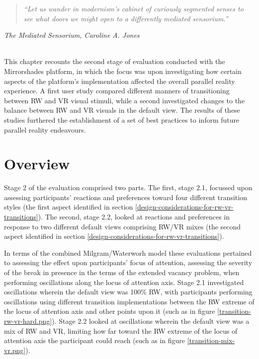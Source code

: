 \begin{quote}
	\textit{``Let us wander in modernism's cabinet of curiously segmented senses to see what doors we might open to a differently mediated sensorium.''}
\end{quote}
\hfill \textit{The Mediated Sensorium, Caroline A. Jones}
\\
\\


\label{chapter-eval-2}

This chapter recounts the second stage of evaluation conducted with the Mirrorshades platform, in which the focus was upon investigating how certain aspects of the platform's implementation affected the overall parallel reality experience. A first user study compared different manners of transitioning between RW and VR visual stimuli, while a second investigated changes to the balance between RW and VR visuals in the default view. The results of these studies furthered the establishment of a set of best practices to inform future parallel reality endeavours.


\section{Overview}

Stage 2 of the evaluation comprised two parts. The first, stage 2.1, focussed upon assessing participants' reactions and preferences toward four different transition styles (the first aspect identified in section \ref{design-considerations-for-rw-vr-transitions}). The second, stage 2.2, looked at reactions and preferences in response to two different default views comprising RW/VR mixes (the second aspect identified in section \ref{design-considerations-for-rw-vr-transitions}).

In terms of the combined Milgram/Waterworh model these evaluations pertained to assessing the effect upon participants' focus of attention, assessing the severity of the break in presence in the terms of the extended vacancy problem, when performing oscillations along the locus of attention axis. Stage 2.1 investigated oscillations wherein the default view was 100\% RW, with participants performing oscillations using different transition implementations between the RW extreme of the locus of attention axis and other points upon it (such as in figure \ref{transition-rw-vr-hard.png}). Stage 2.2 looked at oscillations wherein the default view was a mix of RW and VR, limiting how far toward the RW extreme of the locus of attention axis the participant could reach (such as in figure \ref{transition-mix-vr.png}).


